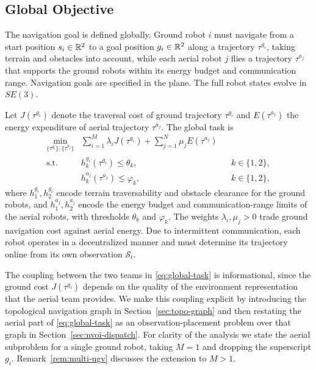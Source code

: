\subsection{Global Objective}
\label{sec:global-objective}

The navigation goal is defined globally. Ground robot $i$ must navigate from a start position $s_i \in \mathbb{R}^2$ to a goal position $g_i \in \mathbb{R}^2$ along a trajectory $\tau^{g_i}$, taking terrain and obstacles into account, while each aerial robot $j$ flies a trajectory $\tau^{a_j}$ that supports the ground robots within its energy budget and communication range. Navigation goals are specified in the plane. The full robot states evolve in $SE(3)$.

Let $J(\tau^{g_i})$ denote the traversal cost of ground trajectory $\tau^{g_i}$ and $E(\tau^{a_j})$ the energy expenditure of aerial trajectory $\tau^{a_j}$. The global task is
\begin{align} \min_{\{\tau^{g_i}\}, \{\tau^{a_j}\}} & \sum_{i=1}^{M} \lambda_i J(\tau^{g_i}) + \sum_{j=1}^{N} \mu_j E(\tau^{a_j}) \label{eq:global-task} \\ \text{s.t.} & h_k^{g_i}(\tau^{g_i}) \leq \theta_k, && k \in \{1, 2\}, \label{eq:ground-constraints} \\ & h_k^{a_j}(\tau^{a_j}) \leq \varphi_k, && k \in \{1, 2\}, \label{eq:aerial-constraints} \end{align}
where $h_1^{g_i}, h_2^{g_i}$ encode terrain traversability and obstacle clearance for the ground robots, and $h_1^{a_j}, h_2^{a_j}$ encode the energy budget and communication-range limits of the aerial robots, with thresholds $\theta_k$ and $\varphi_k$. The weights $\lambda_i, \mu_j > 0$ trade ground navigation cost against aerial energy. Due to intermittent communication, each robot operates in a decentralized manner and must determine its trajectory online from its own observation $\mathcal{S}_t$.

The coupling between the two teams in \eqref{eq:global-task} is informational, since the ground cost $J(\tau^{g_i})$ depends on the quality of the environment representation that the aerial team provides. We make this coupling explicit by introducing the topological navigation graph in Section~\ref{sec:topo-graph} and then restating the aerial part of \eqref{eq:global-task} as an observation-placement problem over that graph in Section~\ref{sec:nvoi-dispatch}. For clarity of the analysis we state the aerial subproblem for a single ground robot, taking $M = 1$ and dropping the superscript $g_i$. Remark~\ref{rem:multi-ugv} discusses the extension to $M > 1$.

